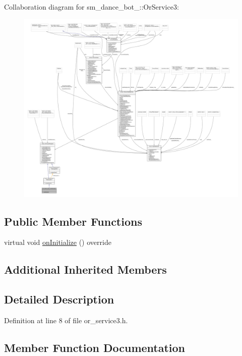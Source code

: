 Collaboration diagram for sm\+\_\+dance\+\_\+bot\+\_\+:\+:Or\+Service3\+:
\nopagebreak
\begin{figure}[H]
\begin{center}
\leavevmode
\includegraphics[width=350pt]{classsm__dance__bot__3_1_1OrService3__coll__graph}
\end{center}
\end{figure}
\subsection*{Public Member Functions}
\begin{DoxyCompactItemize}
\item 
virtual void \hyperlink{classsm__dance__bot__3_1_1OrService3_a838098f188c1b9ffbd11715958cb45fa}{on\+Initialize} () override
\end{DoxyCompactItemize}
\subsection*{Additional Inherited Members}


\subsection{Detailed Description}


Definition at line 8 of file or\+\_\+service3.\+h.



\subsection{Member Function Documentation}
